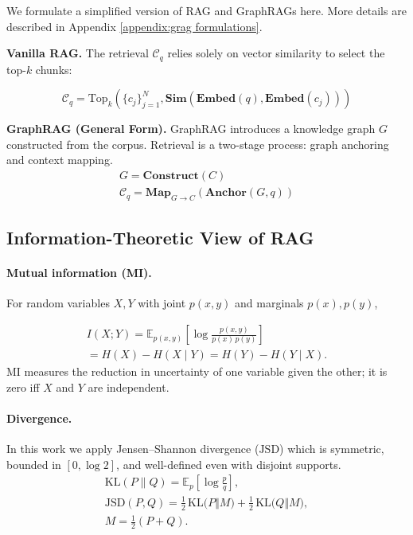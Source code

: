 \documentclass{article}
\theoremstyle{plain}
\theoremstyle{definition}
\theoremstyle{remark}
\begin{document}
We formulate a simplified version of RAG and GraphRAGs here. More details are described in Appendix \ref{appendix:grag formulations}.

\noindent\textbf{Vanilla RAG.} The retrieval $\mathcal{C}_q$ relies solely on vector similarity to select the top-$k$ chunks:
\begin{small}
\begin{equation}
\mathcal{C}_q = \text{Top}_k(\{c_j\}_{j=1}^N, \mathbf{Sim}(\mathbf{Embed}(q), \mathbf{Embed}(c_j)))
\end{equation}
\end{small}


\noindent\textbf{GraphRAG (General Form).} GraphRAG introduces a knowledge graph $G$ constructed from the corpus. Retrieval is a two-stage process: graph anchoring and context mapping.
\begin{gather}
G = \mathbf{Construct}(C) \\ \mathcal{C}_q = \mathbf{Map}_{G \to C}(\mathbf{Anchor}(G, q))
\end{gather}


\subsection{Information-Theoretic View of RAG}

\paragraph{Mutual information (MI).}
For random variables $X,Y$ with joint $p(x,y)$ and marginals $p(x),p(y)$,

\begin{multline}
I(X;Y)=\mathbb{E}_{p(x,y)}\!\left[\log\frac{p(x,y)}{p(x)\,p(y)}\right]\\
=H(X)-H(X\mid Y)=H(Y)-H(Y\mid X).
\label{eq:mi}
\end{multline}
MI measures the reduction in uncertainty of one variable given the other; it is zero iff \(X\) and \(Y\) are independent.

\paragraph{Divergence.}
In this work we apply Jensen–Shannon divergence (\(\mathrm{JSD}\)) which is symmetric, bounded in \([0,\log 2]\), and well-defined even with disjoint supports.
\begin{multline}
\mathrm{KL}(P\parallel Q)=\mathbb{E}_{p}\!\left[\log\frac{p}{q}\right], \\ \mathrm{JSD}(P,Q)=\tfrac12\,\mathrm{KL}\!\big(P\Vert M\big)+\tfrac12\,\mathrm{KL}\!\big(Q\Vert M\big),\\ 
M=\tfrac12(P+Q).
\label{eq:jsd}
\end{multline}
\end{document}
